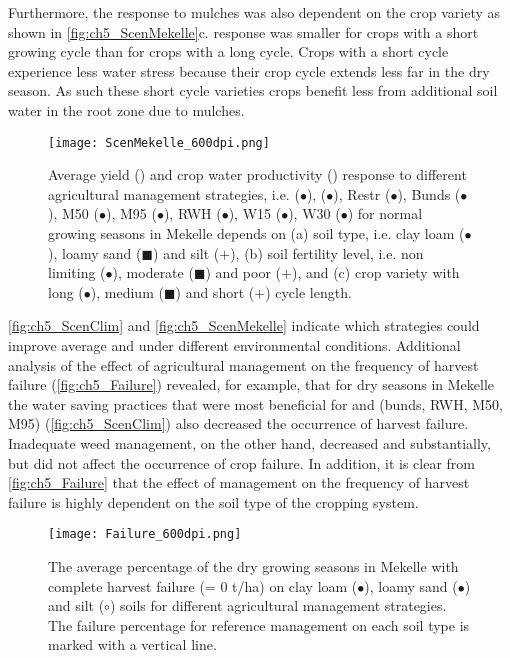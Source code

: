 Furthermore, the response to mulches was also dependent on the crop variety as shown in \autoref{fig:ch5_ScenMekelle}c. \Y response was smaller for crops with a short growing cycle than for crops with a long cycle. Crops with a short cycle experience less water stress because their crop cycle extends less far in the dry season. As such these short cycle varieties crops benefit less from additional soil water in the root zone due to mulches.

\begin{figure}[tbhp]
	\centering
		\texttt{[image: ScenMekelle\_600dpi.png]}
		\caption{Average yield (\Y) and crop water productivity (\WPET) response to different agricultural management strategies, i.e. \TAWm (\textcolor{tawm}{$\bullet$}), \TAWp (\textcolor{tawp}{$\bullet$}), Restr (\textcolor{rest}{$\bullet$}), Bunds  (\textcolor{bunds}{$\bullet$}), M50 (\textcolor{m50}{$\bullet$}), M95 (\textcolor{m95}{$\bullet$}), RWH (\textcolor{rwh}{$\bullet$}), W15 (\textcolor{w15}{$\bullet$}), W30 (\textcolor{w30}{$\bullet$}) for normal growing seasons in Mekelle depends on (a) soil type, i.e. clay loam ($\bullet$), loamy sand ($\blacksquare$) and silt ($+$), (b) soil fertility level, i.e. non limiting ($\bullet$), moderate ($\blacksquare$) and poor ($+$), and (c) crop variety with long ($\bullet$), medium ($\blacksquare$) and short ($+$) cycle length.}
	\label{fig:ch5_ScenMekelle}
\end{figure}

\autoref{fig:ch5_ScenClim} and \autoref{fig:ch5_ScenMekelle} indicate which strategies could improve average \Y and \WPET under different environmental conditions. Additional analysis of the effect of agricultural management on the frequency of harvest failure (\autoref{fig:ch5_Failure}) revealed, for example, that for dry seasons in Mekelle the water saving practices that were most beneficial for \Y and \WPET (bunds, RWH, M50, M95) (\autoref{fig:ch5_ScenClim}) also decreased the occurrence of harvest failure. Inadequate weed management, on the other hand, decreased \Y and \WPET substantially, but did not affect the occurrence of crop failure. In addition, it is clear from \autoref{fig:ch5_Failure} that the effect of management on the frequency of harvest failure is highly dependent on the soil type of the cropping system. 

\begin{figure}[tbhp]
	\centering
		\texttt{[image: Failure\_600dpi.png]}
	\caption{The average percentage of the dry growing seasons in Mekelle with complete harvest failure (\Y= 0 t/ha) on clay loam (\textcolor{bunds}{$\bullet$}), loamy sand ($\bullet$) and silt ($\circ$) soils for different agricultural management strategies. The failure percentage for reference management on each soil type is marked with a vertical line.}
	\label{fig:ch5_Failure}
\end{figure}

